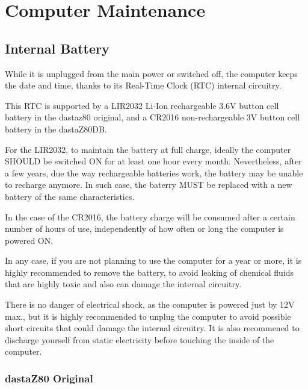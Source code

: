 \section{Computer Maintenance}

    \subsection{Internal Battery}

    While it is unplugged from the main power or switched off, the computer
    keeps the date and time, thanks to its Real-Time Clock (RTC) internal
    circuitry.

    This RTC is supported by a LIR2032 Li-Ion rechargeable 3.6V button cell
    battery in the dastaz80 original, and a CR2016 non-rechargeable 3V button
    cell battery in the dastaZ80DB.

    For the LIR2032, to maintain the battery at full charge, ideally the
    computer SHOULD be switched ON for at least one hour every month.
    Nevertheless, after a few years, due the way rechargeable batteries work,
    the battery may be unable to recharge anymore. In such case, the baterry
    MUST be replaced with a new battery of the same characteristics.

    In the case of the CR2016, the battery charge will be consumed after a
    certain number of hours of use, independently of how often or long the
    computer is powered ON.

    In any case, if you are not planning to use the computer for a year or more,
    it is highly recommended to remove the battery, to avoid leaking of chemical
    fluids that are highly toxic and also can damage the internal circuitry.

    There is no danger of electrical shock, as the computer is powered just by
    12V max., but it is highly recommended to unplug the computer to avoid
    possible short circuits that could damage the internal circuitry. It is also
    recommened to discharge yourself from static electricity before touching the
    inside of the computer.

        \subsubsection{dastaZ80 Original}

